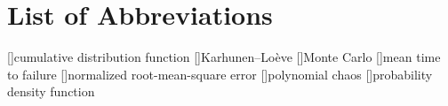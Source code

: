 \chapter*{List of Abbreviations}

\begin{acronym}[NRMSE]
[]{cumulative distribution function}
[]{Karhunen--Lo\`{e}ve}
[]{Monte Carlo}
[]{mean time to failure}
[]{normalized root-mean-square error}
[]{polynomial chaos}
[]{probability density function}
\end{acronym}
